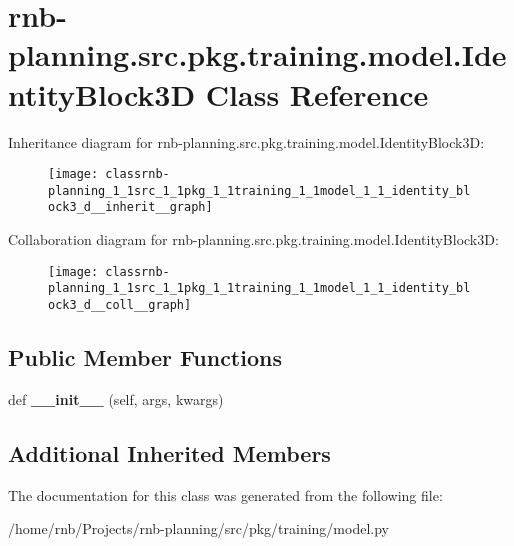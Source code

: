 \hypertarget{classrnb-planning_1_1src_1_1pkg_1_1training_1_1model_1_1_identity_block3_d}{}\section{rnb-\/planning.src.\+pkg.\+training.\+model.\+Identity\+Block3D Class Reference}
\label{classrnb-planning_1_1src_1_1pkg_1_1training_1_1model_1_1_identity_block3_d}


Inheritance diagram for rnb-\/planning.src.\+pkg.\+training.\+model.\+Identity\+Block3D\+:\nopagebreak
\begin{figure}[H]
\begin{center}
\leavevmode
\texttt{[image: classrnb-planning\_1\_1src\_1\_1pkg\_1\_1training\_1\_1model\_1\_1\_identity\_block3\_d\_\_inherit\_\_graph]}
\end{center}
\end{figure}


Collaboration diagram for rnb-\/planning.src.\+pkg.\+training.\+model.\+Identity\+Block3D\+:\nopagebreak
\begin{figure}[H]
\begin{center}
\leavevmode
\texttt{[image: classrnb-planning\_1\_1src\_1\_1pkg\_1\_1training\_1\_1model\_1\_1\_identity\_block3\_d\_\_coll\_\_graph]}
\end{center}
\end{figure}
\subsection*{Public Member Functions}
\begin{DoxyCompactItemize}
\item 
\mbox{\label{classrnb-planning_1_1src_1_1pkg_1_1training_1_1model_1_1_identity_block3_d_ab50c992ec63e49fed83b9aebb43423a0}} 
def {\bfseries \+\_\+\+\_\+init\+\_\+\+\_\+} (self, args, kwargs)
\end{DoxyCompactItemize}
\subsection*{Additional Inherited Members}


The documentation for this class was generated from the following file\+:\begin{DoxyCompactItemize}
\item 
/home/rnb/\+Projects/rnb-\/planning/src/pkg/training/model.\+py\end{DoxyCompactItemize}
